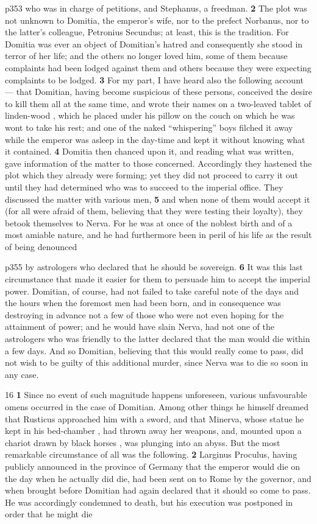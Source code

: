 p353 who was in charge of petitions, and Stephanus, a freedman. \textbf{2} The plot was not unknown to Domitia, the emperor's wife, nor to the prefect Norbanus, nor to the latter's colleague, Petronius Secundus; at least, this is the tradition. For Domitia was ever an object of Domitian's hatred and consequently she stood in terror of her life; and the others no longer loved him, some of them because complaints had been lodged against them and others because they were expecting complaints to be lodged. \textbf{3} For my part, I have heard also the following account \texthebrew{—} that Domitian, having become suspicious of these persons, conceived the desire to kill them all at the same time, and wrote their names on a two-leaved tablet of linden-wood , which he placed under his pillow on the couch on which he was wont to take his rest; and one of the naked ``whispering'' boys filched it away while the emperor was asleep in the day-time and kept it without knowing what it contained. \textbf{4} Domitia then chanced upon it, and reading what was written, gave information of the matter to those concerned. Accordingly they hastened the plot which they already were forming; yet they did not proceed to carry it out until they had determined who was to succeed to the imperial office. They discussed the matter with various men, \textbf{5} and when none of them would accept it (for all were afraid of them, believing that they were testing their loyalty), they betook themselves to Nerva. For he was at once of the noblest birth and of a most amiable nature, and he had furthermore been in peril of his life as the result of being denounced

p355 by astrologers who declared that he should be sovereign. \textbf{6} It was this last circumstance that made it easier for them to persuade him to accept the imperial power. Domitian, of course, had not failed to take careful note of the days and the hours when the foremost men had been born, and in consequence was destroying in advance not a few of those who were not even hoping for the attainment of power; and he would have slain Nerva, had not one of the astrologers who was friendly to the latter declared that the man would die within a few days. And so Domitian, believing that this would really come to pass, did not wish to be guilty of this additional murder, since Nerva was to die so soon in any case.

16
\textbf{1} Since no event of such magnitude happens unforeseen, various unfavourable omens occurred in the case of Domitian. Among other things he himself dreamed that Rusticus approached him with a sword, and that Minerva, whose statue he kept in his bed-chamber , had thrown away her weapons, and, mounted upon a chariot drawn by black horses , was plunging into an abyss. But the most remarkable circumstance of all was the following. \textbf{2} Larginus Proculus, having publicly announced in the province of Germany that the emperor would die on the day when he actually did die, had been sent on to Rome by the governor, and when brought before Domitian had again declared that it should so come to pass. He was accordingly condemned to death, but his execution was postponed in order that he might die

